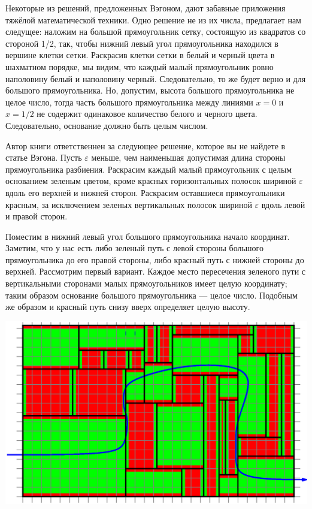 Некоторые из решений, предложенных Вэгоном, дают забавные приложения тяжёлой математической техники.
Одно решение не из их числа, предлагает нам следущее:
наложим на большой прямоугольник сетку,  состоящую из квадратов со стороной 1/2,  так, чтобы нижний  левый угол прямоугольника находился в вершине клетки сетки.  
Раскрасив клетки сетки в белый и черный цвета в шахматном порядке, 
мы видим, что каждый малый прямоугольник ровно наполовину белый и наполовину черный. Следовательно, то же будет верно и для большого  прямоугольника.
Но, допустим, высота большого  прямоугольника не  целое число, тогда часть 
большого  прямоугольника между линиями  $x=0$ и   $x=1/2$  не содержит одинаковое количество белого и черного цвета. 
Следовательно, основание должно быть целым числом.\heart


Автор книги ответственнен за следующее решение, которое вы не найдете в статье Вэгона.
Пусть $\varepsilon$ меньше, чем наименьшая допустимая длина стороны прямоугольника разбиения.
Раскрасим каждый малый прямоугольник с целым основанием зеленым цветом, кроме красных горизонтальных  полосок  шириной $\varepsilon$ вдоль его верхней и нижней  сторон.
Раскрасим оставшиеся прямоугольники красным, за исключением зеленых вертикальных   полосок  шириной $\varepsilon$ вдоль левой и правой сторон.


Поместим в нижний левый  угол  большого прямоугольника начало координат. 
Заметим, что у нас есть либо зеленый путь с левой стороны  большого прямоугольника до его правой стороны, либо красный путь с нижней стороны до верхней. 
Рассмотрим первый вариант.
Каждое  место пересечения  зеленого пути с вертикальными  сторонами  малых прямоугольников имеет целую координату; таким образом основание большого прямоугольника --- целое число.
Подобным же образом и красный путь снизу вверх определяет целую высоту.



\begin{center}
\includegraphics[scale=0.5]{Figs/Insight/green}
\end{center}




